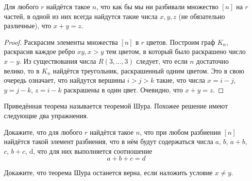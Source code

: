 \begin{thm}
Для любого $r$ найдётся такое $n$, что как бы мы ни разбивали множество $[n]$ на $r$ частей, в одной из них всегда найдутся такие числа $x, y, z$ (не обязательно различные), что $x+y=z$.
\end{thm}
\begin{proof}
Раскрасим элементы множества $[n]$ в $r$ цветов. Построим граф $K_n$, раскрасив каждое ребро $xy, x>y$ тем цветом, в который было раскрашено число $x-y$. Из существования числа $R(3, \ldots, 3)$ следует, что если $n$ достаточно велико, то в $K_n$ найдётся треугольник, раскрашенный одним цветом. Это в свою очередь означает, что найдутся вершины $i> j> k$ такие, что числа $x=i-j$, $y=j-k$, $z=i-k$ раскрашены в один цвет. Очевидно, что $x + y = z$.
\end{proof}

Приведённая теорема называется теоремой Шура. Похожее решение имеют следующие два упражнения.

\begin{exercise}
Докажите, что для любого $r$ найдётся такое $n$, что при любом разбиении $[n]$ найдётся такой элемент разбиения, что в нём будут содержаться числа $a$, $b$, $a+b$, $c$, $b+c$, d, что для них выполняется соотношение
$$a+b+c = d$$
\end{exercise}

\begin{exercise}
Докажите, что теорема Шура останется верна, если наложить условие $x\not= y$.
\end{exercise}